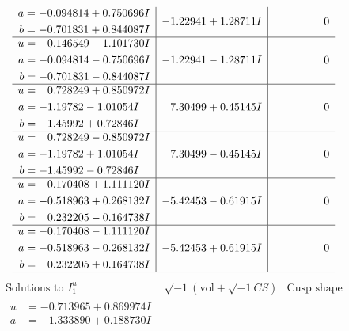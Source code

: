 \documentclass[1p]{elsarticle_modified}
\theoremstyle{definition}
\newcommand{\I}{\sqrt{-1}}
\begin{document}
$$\begin{array}{c|c|c}
\begin{aligned}
a &= -0.094814 + 0.750696 I \\
b &= -0.701831 + 0.844087 I\end{aligned}
 & -1.22941 + 1.28711 I & \phantom{-0.000000 } 0 \\ \hline\begin{aligned}
u &= \phantom{-}0.146549 - 1.101730 I \\
a &= -0.094814 - 0.750696 I \\
b &= -0.701831 - 0.844087 I\end{aligned}
 & -1.22941 - 1.28711 I & \phantom{-0.000000 } 0 \\ \hline\begin{aligned}
u &= \phantom{-}0.728249 + 0.850972 I \\
a &= -1.19782 - 1.01054 I \\
b &= -1.45992 + 0.72846 I\end{aligned}
 & \phantom{-}7.30499 + 0.45145 I & \phantom{-0.000000 } 0 \\ \hline\begin{aligned}
u &= \phantom{-}0.728249 - 0.850972 I \\
a &= -1.19782 + 1.01054 I \\
b &= -1.45992 - 0.72846 I\end{aligned}
 & \phantom{-}7.30499 - 0.45145 I & \phantom{-0.000000 } 0 \\ \hline\begin{aligned}
u &= -0.170408 + 1.111120 I \\
a &= -0.518963 + 0.268132 I \\
b &= \phantom{-}0.232205 - 0.164738 I\end{aligned}
 & -5.42453 - 0.61915 I & \phantom{-0.000000 } 0 \\ \hline\begin{aligned}
u &= -0.170408 - 1.111120 I \\
a &= -0.518963 - 0.268132 I \\
b &= \phantom{-}0.232205 + 0.164738 I\end{aligned}
 & -5.42453 + 0.61915 I & \phantom{-0.000000 } 0\\
 \hline 
 \end{array}$$\newpage$$\begin{array}{c|c|c}  
\text{Solutions to }I^u_{1}& \I (\text{vol} + \sqrt{-1}CS) & \text{Cusp shape}\\
 \hline 
\begin{aligned}
u &= -0.713965 + 0.869974 I \\
a &= -1.333890 + 0.188730 I \\

\end{aligned}
\end{array}$$
\end{document}
